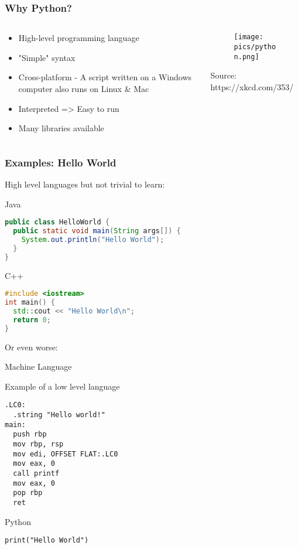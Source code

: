 \documentclass[10pt, a4paper]{beamer} %
\begin{document}
\begin{frame}[c]\frametitle{Why Python?}
	\begin{columns}
		\begin{column}{0.5\textwidth}
			\begin{itemize}
				\item High-level programming language
				\item "Simple" syntax
				\item Cross-platform - A script written on a Windows computer also runs on Linux \& Mac
				\item Interpreted => Easy to run
				\item Many libraries available
			\end{itemize}
		\end{column}
		\begin{column}{0.5\textwidth}  %
			\begin{figure}
				\texttt{[image: pics/python.png]}
			\end{figure}
			\tiny Source: https://xkcd.com/353/
		\end{column}
	\end{columns}

\end{frame}

\begin{frame}\frametitle{Examples: Hello World}
	High level languages but not trivial to learn:
	\begin{block}{Java}
		{
			\begin{lstlisting}[language=Java]
public class HelloWorld {
  public static void main(String args[]) {
    System.out.println("Hello World");
  }
}
  \end{lstlisting}
		}
	\end{block}

	\begin{block}{C++}
		{
			\begin{lstlisting}[language=C++, morekeywords=include]
#include <iostream>
int main() {
  std::cout << "Hello World\n";
  return 0;
}
  \end{lstlisting}
		}
	\end{block}
	\framebreak
	Or even worse:
	\begin{block}{Machine Language}

		Example of a low level language
		\begin{lstlisting}[language={}]
.LC0:
  .string "Hello world!"
main:
  push rbp
  mov rbp, rsp
  mov edi, OFFSET FLAT:.LC0
  mov eax, 0
  call printf
  mov eax, 0
  pop rbp
  ret
\end{lstlisting}

	\end{block}

	\begin{block}{Python}
		\begin{lstlisting}
print("Hello World")
    \end{lstlisting}
	\end{block}

\end{frame}
\end{document}
